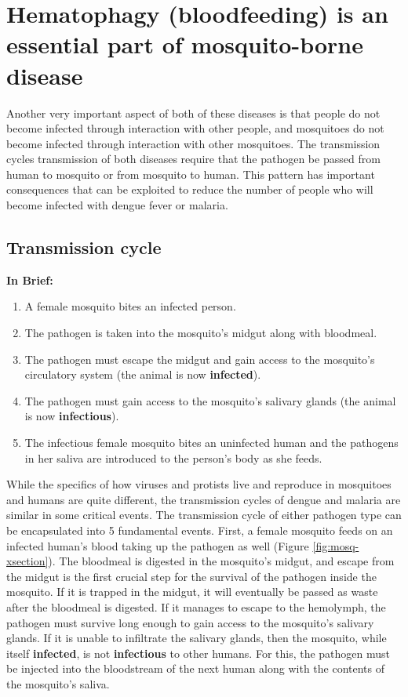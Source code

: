 \section{Hematophagy (bloodfeeding) is an essential part of mosquito-borne disease}

Another very important aspect of both of these diseases is that people do not become infected through interaction with other people, and mosquitoes do not become infected through interaction with other mosquitoes.
The transmission cycles transmission of both diseases require that the pathogen be passed from human to mosquito or from mosquito to human.
This pattern has important consequences that can be exploited to reduce the number of people who will become infected with dengue fever or malaria.

\subsection{Transmission cycle}

\textbf{In Brief:}
\begin{enumerate}
\item A female mosquito bites an infected person.
\item The pathogen is taken into the mosquito's midgut along with bloodmeal.
\item The pathogen must escape the midgut and gain access to the mosquito's circulatory system (the animal is now \textbf{infected}).
\item The pathogen must gain access to the mosquito's salivary glands (the animal is now \textbf{infectious}).
\item The infectious female mosquito bites an uninfected human and the pathogens in her saliva are introduced to the person's body as she feeds.
\end{enumerate}



While the specifics of how viruses and protists live and reproduce in mosquitoes and humans are quite different, the transmission cycles of dengue and malaria are similar in some critical events.
The transmission cycle of either pathogen type can be encapsulated into 5 fundamental events.
First, a female mosquito feeds on an infected human's blood taking up the pathogen as well (Figure \ref{fig:mosq-xsection}).
The bloodmeal is digested in the mosquito's midgut, and escape from the midgut is the first crucial step for the survival of the pathogen inside the mosquito.
If it is trapped in the midgut, it will eventually be passed as waste after the bloodmeal is digested.
If it manages to escape to the \gls{hemolymph}, the pathogen must survive long enough to gain access to the mosquito's salivary glands.
If it is unable to infiltrate the salivary glands, then the mosquito, while itself \textbf{infected}, is not \textbf{infectious} to other humans.
For this, the pathogen must be injected into the bloodstream of the next human along with the contents of the mosquito's saliva.

